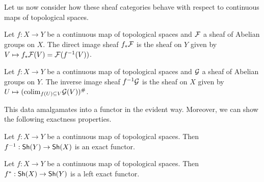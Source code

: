 Let us now consider how these sheaf categories behave with respect to continuous maps of topological spaces. 
\begin{definition}\label{def: direct image sheaf}
    Let $f:X\to Y$ be a continuous map of topological spaces and $\mathcal{F}$ a sheaf of Abelian groups on $X$. The direct image sheaf $f_{*}\mathcal{F}$ is the sheaf on $Y$ given by $V\mapsto f_{*}\mathcal{F}(V)=\mathcal{F}(f^{-1}(V))$. 
\end{definition}
\begin{definition}\label{def: inverse image sheaf}
    Let $f:X\to Y$ be a continuous map of topological spaces and $\mathcal{G}$ a sheaf of Abelian groups on $Y$. The inverse image sheaf $f^{-1}\mathcal{G}$ is the sheaf on $X$ given by $U\mapsto(\mathrm{colim}_{f(U)\subseteq V}\mathcal{G}(V))^{\#}$. 
\end{definition}
This data amalgamates into a functor in the evident way. Moreover, we can show the following exactness properties. 
\begin{proposition}\label{prop: exactness of inverse image}
    Let $f:X\to Y$ be a continuous map of topological spaces. Then $f^{-1}:\mathsf{Sh}(Y)\to\mathsf{Sh}(X)$ is an exact functor. 
\end{proposition}
\begin{proposition}\label{prop: left exactness of direct image}
    Let $f:X\to Y$ be a continuous map of topological spaces. Then $f^{*}:\mathsf{Sh}(X)\to\mathsf{Sh}(Y)$ is a left exact functor. 
\end{proposition}